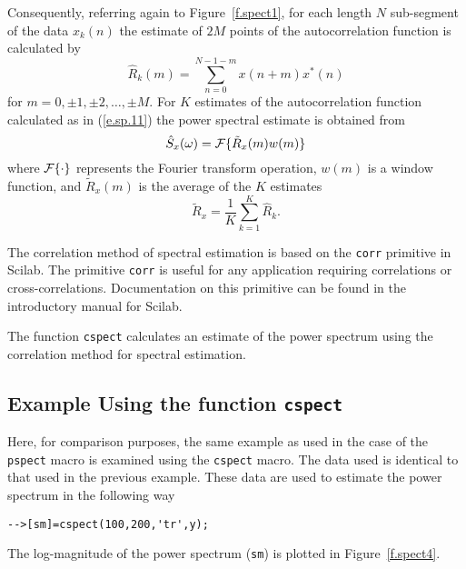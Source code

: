 	Consequently, referring again to Figure~\ref{f.spect1},
for each length $N$ sub-segment of the data $x_k(n)$ the estimate
of $2M$ points of the autocorrelation function is calculated by
%
\begin{equation}
\hat{R}_k(m)=\sum_{n=0}^{N-1-m}x(n+m)x^*(n)
\label{e.sp.11}
\end{equation}
%
for $m=0,\pm1,\pm2,\ldots,\pm M$.  For $K$ estimates of the autocorrelation 
function calculated as in (\ref{e.sp.11}) the power spectral estimate is
obtained from
%
\begin{equation}
\hat{S}_x(\omega)={\cal F}\{\tilde{R}_x(m)w(m)\}
\label{e.sp.12}
\end{equation}
%
where ${\cal F}\{\cdot\}$ represents the Fourier transform operation,
$w(m)$ is a window function, and $\tilde{R}_x(m)$ is the
average of the $K$ estimates
%
\begin{equation}
\tilde{R}_x=\frac{1}{K}\sum_{k=1}^{K}\hat{R}_k.
\label{e.sp.13}
\end{equation}
%

	The correlation method of spectral estimation is based
on the {\tt corr} primitive in Scilab.  The primitive {\tt corr}
is useful for any application requiring correlations or cross-correlations.
Documentation on this primitive can be found in the introductory
manual for Scilab.

The function {\tt cspect} calculates an estimate of
the power spectrum using the correlation method for spectral estimation.

\subsection{Example Using the function {\tt cspect}}

	Here, for comparison purposes, the same example as used in
the case of the {\tt pspect} macro is examined using the {\tt cspect}
macro.  The data used is identical
to that used in the previous example.  These data 
are used to estimate the power spectrum
in the following way
\begin{verbatim}
-->[sm]=cspect(100,200,'tr',y);
\end{verbatim}
The log-magnitude of the power spectrum ({\tt sm}) is plotted in
Figure~\ref{f.spect4}.  


